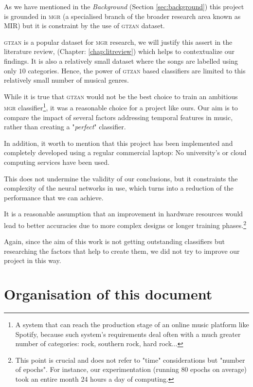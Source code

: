 As we have mentioned in the {\it Background } (Section \ref{sec:background}) this project is grounded in \textsc{mgr} (a specialised branch of the broader research area known as \textsc{MIR}) but it is constraint by the use of \textsc{gtzan} dataset.

\textsc{gtzan} is a popular dataset for \textsc{mgr} research, we will justify this assert in the literature review, (Chapter: \ref{chap:litreview}) which helps to contextualize our findings. It is also a relatively small dataset where the songs are labelled using only $10$ categories. Hence, the power of \textsc{gtzan} based classifiers are limited to this relatively small number of musical genres.

While it is true that \textsc{gtzan} would not be the best choice to train an ambitious \textsc{mgr} classifier\footnote{A system that can reach the production stage of an online music platform like Spotify, because such system's requirements deal often with a much greater number of categories: rock, southern rock, hard rock...}, it was a reasonable choice for a project like ours. Our aim is to compare the impact of several factors addressing temporal features in music, rather than creating a "{\it perfect}" classifier.

In addition, it worth to mention that this project has been implemented and completely developed using a regular commercial laptop: No university's or cloud computing services have been used.

This does not undermine the validity of our conclusions, but it constraints the complexity of the neural networks in use, which turns into a reduction of the performance that we can achieve.

It is a reasonable assumption that an improvement in hardware resources would lead to better accuracies due to more complex designs or longer training phases.\footnote{This point is crucial and does not refer to "time" considerations but "number of epochs". For instance, our experimentation (running 80 epochs on average) took an entire month 24 hours a day of computing.}

Again, since the aim of this work is not getting outstanding classifiers but researching the factors that help to create them, we did not try to improve our project in this way.

\section{Organisation of this document}

